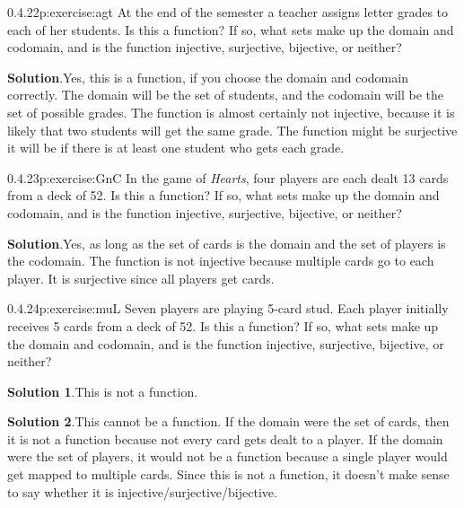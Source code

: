 \documentclass[twoside,11pt,]{book}
\newcommand{\blocktitlefont}{\relax}
\numberwithin{equation}{chapter}
\begin{document}
\begin{divisionsolution}{0.4.22}{}{p:exercise:agt}%
At the end of the semester a teacher assigns letter grades to each of her students. Is this a function? If so, what sets make up the domain and codomain, and is the function injective, surjective, bijective, or neither?%
\par\smallskip%
\noindent\textbf{\blocktitlefont Solution}.\quad{}Yes, this is a function, if you choose the domain and codomain correctly. The domain will be the set of students, and the codomain will be the set of possible grades. The function is almost certainly not injective, because it is likely that two students will get the same grade. The function might be surjective \textendash{} it will be if there is at least one student who gets each grade.%
\end{divisionsolution}%
\begin{divisionsolution}{0.4.23}{}{p:exercise:GnC}%
In the game of \emph{Hearts}, four players are each dealt 13 cards from a deck of 52. Is this a function? If so, what sets make up the domain and codomain, and is the function injective, surjective, bijective, or neither?%
\par\smallskip%
\noindent\textbf{\blocktitlefont Solution}.\quad{}Yes, as long as the set of cards is the domain and the set of players is the codomain. The function is not injective because multiple cards go to each player. It is surjective since all players get cards.%
\end{divisionsolution}%
\begin{divisionsolution}{0.4.24}{}{p:exercise:muL}%
Seven players are playing 5-card stud. Each player initially receives 5 cards from a deck of 52. Is this a function? If so, what sets make up the domain and codomain, and is the function injective, surjective, bijective, or neither?%
\par\smallskip%
\noindent\textbf{\blocktitlefont Solution 1}.\quad{}This is not a function.%
\par\smallskip%
\noindent\textbf{\blocktitlefont Solution 2}.\quad{}This cannot be a function. If the domain were the set of cards, then it is not a function because not every card gets dealt to a player. If the domain were the set of players, it would not be a function because a single player would get mapped to multiple cards. Since this is not a function, it doesn't make sense to say whether it is injective\slash{}surjective\slash{}bijective.%
\end{divisionsolution}%
\end{document}
